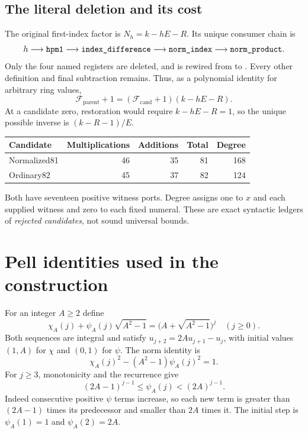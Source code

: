 \documentclass[11pt,letterpaper]{article}
\theoremstyle{definition}\newtheorem{definition}[theorem]{Definition}
\theoremstyle{remark}\newtheorem{remark}[theorem]{Remark}
\newcommand{\code}[1]{\texttt{\detokenize{#1}}}
\begin{document}
\subsection{The literal deletion and its cost}
The original first-index factor is $N_h=k-hE-R$. Its unique consumer chain is
\[
 h\longrightarrow\code{hpm1}\longrightarrow\code{index_difference}
 \longrightarrow\code{norm_index}\longrightarrow\code{norm_product}.
\]
Only the four named registers are deleted, and \code{all_units} is rewired from \code{norm_product} to \code{norm_four}. Every other definition and final subtraction remains. Thus, as a polynomial identity for arbitrary ring values,
\begin{equation}\label{fup:fd:eq:productidentity}
 \mathcal F_{\mathrm{parent}}+1
 = (\mathcal F_{\mathrm{cand}}+1)(k-hE-R).
\end{equation}
At a candidate zero, restoration would require $k-hE-R=1$, so the unique possible inverse is $(k-R-1)/E$.

\begin{center}
\begin{tabular}{lrrrr}
\toprule
Candidate & Multiplications & Additions & Total & Degree\\
\midrule
Normalized81 & 46 & 35 & 81 & 168\\
Ordinary82 & 45 & 37 & 82 & 124\\
\bottomrule
\end{tabular}
\end{center}
Both have seventeen positive witness ports. Degree assigns one to $x$ and each supplied witness and zero to each fixed numeral. These are exact syntactic ledgers of \emph{rejected candidates}, not sound universal bounds.

\section{Pell identities used in the construction}\label{fup:fd:sec:pell}
For an integer $A\ge2$ define
\begin{equation}\label{fup:fd:eq:pell}
 \chi_A(j)+\psi_A(j)\sqrt{A^2-1}
 =\bigl(A+\sqrt{A^2-1}\bigr)^j\quad(j\ge0).
\end{equation}
Both sequences are integral and satisfy $u_{j+2}=2Au_{j+1}-u_j$, with initial values $(1,A)$ for $\chi$ and $(0,1)$ for $\psi$. The norm identity is
\[
 \chi_A(j)^2-(A^2-1)\psi_A(j)^2=1.
\]
For $j\ge3$, monotonicity and the recurrence give
\begin{equation}\label{fup:fd:eq:pellbounds}
 (2A-1)^{j-1}\le\psi_A(j)<(2A)^{j-1}.
\end{equation}
Indeed consecutive positive $\psi$ terms increase, so each new term is greater than $(2A-1)$ times its predecessor and smaller than $2A$ times it. The initial step is $\psi_A(1)=1$ and $\psi_A(2)=2A$.
\end{document}
